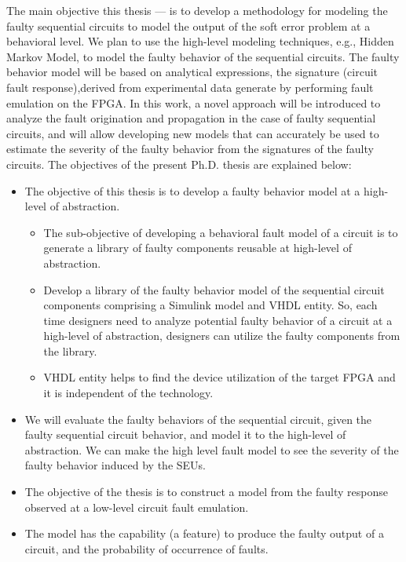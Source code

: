 The main objective this thesis --- is to develop a methodology for modeling the faulty sequential circuits to model the output of the soft error problem at a behavioral level. We plan to use the high-level modeling techniques, e.g., Hidden Markov Model, to model the faulty behavior of the sequential circuits. The faulty behavior model will be based on analytical expressions, the signature (circuit fault response),derived from  experimental data generate by performing fault emulation on the FPGA. In this work, a novel approach will be introduced to analyze the fault origination and propagation in the case of faulty sequential circuits, and will allow developing new models that can accurately be used to estimate the severity of the faulty behavior from the signatures of the faulty circuits. The objectives of the present Ph.D. thesis are explained below: 
\begin{itemize}

\item{The objective of this thesis is to develop a faulty behavior model
at a high-level of abstraction.} 
\begin{itemize}
\item The sub-objective of developing a behavioral fault model of a circuit is to generate a library of faulty components reusable at high-level of abstraction.
\item{Develop a library of the faulty behavior model of the sequential circuit
components comprising a Simulink model and VHDL entity. So, each time designers need to analyze potential faulty behavior of a circuit at a high-level of abstraction, designers can utilize the faulty components from the library}.
\item VHDL entity helps to find the device utilization of the target FPGA and it is independent of the technology.
\end{itemize}

\item We will evaluate the faulty behaviors of the sequential circuit, given the faulty sequential circuit behavior, and model it to the high-level of abstraction. We can make the high level fault model to see the severity of the faulty behavior induced by the SEUs.
\item The objective of the thesis is to construct a model from the faulty response observed at a low-level circuit fault emulation.



\item{The model has the capability (a feature) to produce the faulty output of a circuit, and the probability of occurrence of faults.}


\end{itemize}
